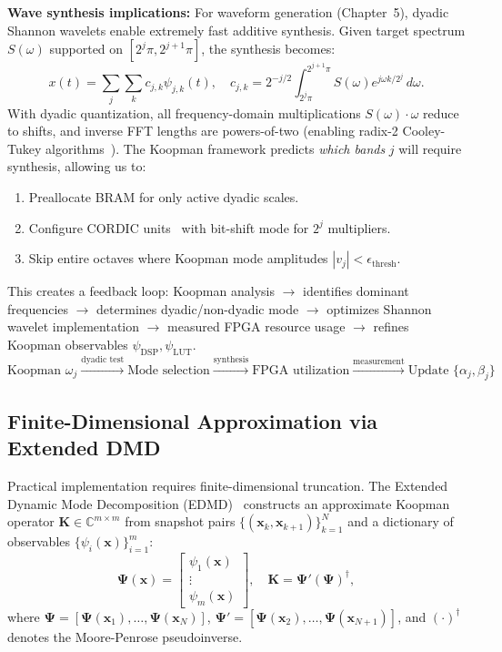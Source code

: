 \noindent\textbf{Wave synthesis implications:} For waveform generation (Chapter~5), dyadic Shannon wavelets enable extremely fast additive synthesis. Given target spectrum $S(\omega)$ supported on $[2^j \pi, 2^{j+1}\pi]$, the synthesis becomes:
\[
x(t) = \sum_{j} \sum_{k} c_{j,k} \psi_{j,k}(t), \quad c_{j,k} = 2^{-j/2} \int_{2^j \pi}^{2^{j+1}\pi} S(\omega) e^{j\omega k / 2^j} \, d\omega.
\]
With dyadic quantization, all frequency-domain multiplications $S(\omega) \cdot \omega$ reduce to shifts, and inverse FFT lengths are powers-of-two (enabling radix-2 Cooley-Tukey algorithms~\cite{Muller2006}). The Koopman framework predicts \emph{which bands} $j$ will require synthesis, allowing us to:
\begin{enumerate}
\item Preallocate BRAM for only active dyadic scales.
\item Configure CORDIC units~\cite{Meher2008} with bit-shift mode for $2^j$ multipliers.
\item Skip entire octaves where Koopman mode amplitudes $|v_j| < \epsilon_{\text{thresh}}$.
\end{enumerate}

This creates a feedback loop: Koopman analysis $\to$ identifies dominant frequencies $\to$ determines dyadic/non-dyadic mode $\to$ optimizes Shannon wavelet implementation $\to$ measured FPGA resource usage $\to$ refines Koopman observables $\psi_{\text{DSP}}, \psi_{\text{LUT}}$.
\begin{equation}
\boxed{
\text{Koopman } \omega_j \xrightarrow{\text{dyadic test}} \text{Mode selection} \xrightarrow{\text{synthesis}} \text{FPGA utilization} \xrightarrow{\text{measurement}} \text{Update } \{\alpha_j, \beta_j\}
}
\label{eq:dyadic_feedback_loop}
\end{equation}

\subsection{Finite-Dimensional Approximation via Extended DMD}

Practical implementation requires finite-dimensional truncation. The Extended Dynamic Mode Decomposition (EDMD)~\cite{Williams2015} constructs an approximate Koopman operator $\mathbf{K} \in \mathbb{C}^{m \times m}$ from snapshot pairs $\{(\mathbf{x}_k, \mathbf{x}_{k+1})\}_{k=1}^{N}$ and a dictionary of observables $\{\psi_i(\mathbf{x})\}_{i=1}^{m}$:
\[
\mathbf{\Psi}(\mathbf{x}) = \begin{bmatrix} \psi_1(\mathbf{x}) \\ \vdots \\ \psi_m(\mathbf{x}) \end{bmatrix}, \quad
\mathbf{K} = \mathbf{\Psi}' (\mathbf{\Psi})^\dagger,
\]
where $\mathbf{\Psi} = [\mathbf{\Psi}(\mathbf{x}_1), \ldots, \mathbf{\Psi}(\mathbf{x}_N)]$, $\mathbf{\Psi}' = [\mathbf{\Psi}(\mathbf{x}_2), \ldots, \mathbf{\Psi}(\mathbf{x}_{N+1})]$, and $(\cdot)^\dagger$ denotes the Moore-Penrose pseudoinverse.

